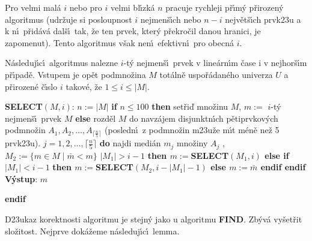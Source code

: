 \flushpar Pro velmi mal\'a $i$ nebo pro $i$ velmi bl\'\i zk\'a $n$ 
pracuje rychleji p\v r\'\i m\'y p\v rirozen\'y algoritmus (udr\v zuje si 
posloupnost $i$ nejmen\-\v s\'\i ch nebo $n-i$ nejv\v et\v s\'\i ch prvk\accent23u 
a k n\'\i\ p\v rid\'av\'a dal\v s\'\i\ tak, \v ze ten prvek, kter\'y p\v re\-kro\v cil 
danou hranici, je 
zapomenut). Tento algoritmus v\v sak nen\'\i\ 
efektivn\'\i\ pro obecn\'a $i$. 
\medskip

\flushpar N\'asleduj\'\i c\'\i\ algoritmus nalezne $i$-t\'y nejmen\v s\'\i\ 
prvek v line\'arn\'\i m \v case i v nejhor\v s\'\i m p\v r\'\i pad\v e.  Vstupem 
je op\v et podmno\v zina $M$ tot\'aln\v e 
uspo\v r\'adan\'eho univerza $U$ a p\v rirozen\'e \v c\'\i slo $i$ takov\'e, \v ze 
$1\le i\le |M|$.  
\medskip

{\bf SELECT$(M,i)$}:\newline 
$n:=|M|$\newline 
{\bf if} $n\le 100$ {\bf then\newline 
\phantom{{\rm---}}}set\v ri\v d mno\v zinu $M$, $m:=$ $i$-t\'y nejmen\v s\'\i\ 
prvek $M$\newline 
{\bf else\newline 
\phantom{{\rm---}}}rozd\v el $M$ do navz\'ajem disjunktn\'\i ch 
p\v etiprvkov\'ych podmno\v zin $A_1,A_2,\dots,A_{\lceil\frac n5\rceil}$\newline 
\phantom{---}(posledn\'\i\ z podmno\v zin m\accent23u\v ze m\'\i t m\'en\v e ne\v z 5 prvk\accent23u).\newline 
\phantom{---}{\bf for every} $j=1,2,\dots,\lceil\frac n5\rceil$ {\bf do\newline 
\phantom{{\rm------}}}najdi medi\'an $m_j$ mno\v ziny $A_j$\newline 
{}, $M_2:=\{m\in 
M\mid\bar {m}<m\}$\newline 
\phantom{---}{\bf if} $|M_1|>i-1$ {\bf then\newline 
\phantom{{\rm ------}}$m:=$SELECT$(M_1,i)$\newline 
\phantom{{\rm ---}}else\newline 
\phantom{{\rm------}}if} $|M_1|<i-1$ {\bf then\newline 
\phantom{{\rm ---------}}$m:=$SELECT$(M_2,i-|M_1|-1)$\newline 
\phantom{{\rm ------}}else\newline 
\phantom{{\rm ---------}}$m:=\bar {m}$\newline 
\phantom{{\rm ------}}endif\newline 
\phantom{{\rm ---}}endif\newline 
\phantom{{\rm ---}}V\'ystup}: $m$\newline 
{\bf endif
\medskip

}\flushpar D\accent23ukaz korektnosti algoritmu je stejn\'y 
jako u algoritmu {\bf FIND}. 
Zb\'yv\'a vy\v set\v rit slo\v zitost. Nej\-prve dok\'a\v zeme n\'asleduj\'\i c\'\i\ 
lemma.
\medskip

